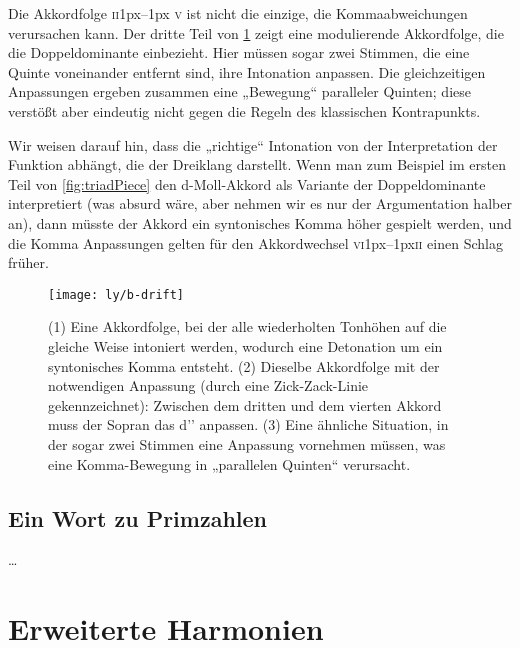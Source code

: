 \documentclass[ngerman,11pt]{scrartcl}
\begin{document}
Die Akkordfolge \textsc{ii}\kern1px–\kern1px \textsc{v} ist nicht die einzige,
die Kommaabweichungen verursachen kann. Der dritte Teil von \cref{fig:drift}
zeigt eine modulierende Akkordfolge, die die Doppeldominante einbezieht. Hier
müssen sogar zwei Stimmen, die eine Quinte voneinander entfernt sind, ihre
Intonation anpassen. Die gleichzeitigen Anpassungen ergeben zusammen eine
„Bewegung“ paralleler Quinten; diese verstößt aber eindeutig nicht gegen die
Regeln des klassischen Kontrapunkts.

Wir weisen darauf hin, dass die „richtige“ Intonation von der Interpretation der
Funktion abhängt, die der Dreiklang darstellt. Wenn man zum Beispiel im ersten
Teil von \cref{fig:triadPiece} den d-Moll-Akkord als Variante der
Doppeldominante interpretiert (was absurd wäre,
aber nehmen wir es nur der Argumentation halber an), dann müsste der Akkord ein
syntonisches Komma höher gespielt werden, und die Komma Anpassungen gelten für
den Akkordwechsel \textsc{vi}\kern1px–\kern1px\textsc{ii} einen Schlag früher.

\begin{figure}
  \centering
  \texttt{[image: ly/b-drift]}
  \caption{(1) Eine Akkordfolge, bei der alle wiederholten Tonhöhen auf die   
  	gleiche Weise intoniert werden, wodurch eine Detonation um ein syntonisches
  	Komma entsteht.%
  	\quad(2) Dieselbe Akkordfolge mit der notwendigen Anpassung (durch eine
  	Zick-Zack-Linie gekennzeichnet): Zwischen dem dritten und dem vierten Akkord
  	muss der Sopran das d’’ anpassen.%
  	\quad(3) Eine ähnliche Situation, in der sogar zwei Stimmen eine Anpassung
  	vornehmen müssen, was eine Komma-Bewegung in „parallelen Quinten“
  	verursacht.}\label{fig:drift}
\end{figure}

\subsection{Ein Wort zu Primzahlen}

…

\section{Erweiterte Harmonien}
\end{document}
